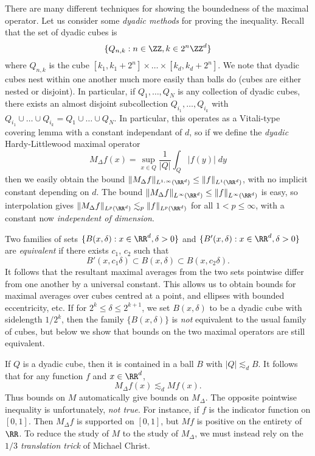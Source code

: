There are many different techniques for showing the boundedness of the maximal operator. Let us consider some \emph{dyadic methods} for proving the inequality. Recall that the set of dyadic cubes is
%
\[ \{ Q_{n,k} : n \in \ZZ, k \in 2^n \ZZ^d \} \]
%
where $Q_{n,k}$ is the cube $[k_1, k_1 + 2^n] \times \dots \times [k_d, k_d + 2^n]$. We note that dyadic cubes nest within one another much more easily than balls do (cubes are either nested or disjoint). In particular, if $Q_1,\dots,Q_N$ is any collection of dyadic cubes, there exists an almost disjoint subcollection $Q_{i_1}, \dots, Q_{i_k}$ with $Q_{i_1} \cup \dots \cup Q_{i_k} = Q_1 \cup \dots \cup Q_N$. In particular, this operates as a Vitali-type covering lemma with a constant independant of $d$, so if we define the \emph{dyadic} Hardy-Littlewood maximal operator
%
\[ M_\Delta f(x) = \sup_{x \in Q} \frac{1}{|Q|} \int_Q |f(y)|\; dy \]
%
then we easily obtain the bound $\| M_\Delta f \|_{L^{1,\infty}(\RR^d)} \leq \| f \|_{L^1(\RR^d)}$, with no implicit constant depending on $d$. The bound $\| M_\Delta f \|_{L^\infty(\RR^d)} \leq \| f \|_{L^\infty(\RR^d)}$ is easy, so interpolation gives $\| M_\Delta f \|_{L^p(\RR^d)} \lesssim_p \| f \|_{L^p(\RR^d)}$ for all $1 < p \leq \infty$, with a constant now \emph{independent of dimension}.

Two families of sets $\{ B(x,\delta) : x \in \RR^d, \delta > 0 \}$ and $\{ B'(x,\delta) : x \in \RR^d, \delta > 0 \}$ are \emph{equivalent} if there exists $c_1$, $c_2$ such that
%
\[ B'(x, c_1 \delta) \subset B(x,\delta) \subset B(x,c_2 \delta). \]
%
It follows that the resultant maximal averages from the two sets pointwise differ from one another by a universal constant. This allows us to obtain bounds for maximal averages over cubes centred at a point, and ellipses with bounded eccentricity, etc. If for $2^k \leq \delta \leq 2^{k+1}$, we set $B(x,\delta)$ to be a dyadic cube with sidelength $1/2^k$, then the family $\{ B(x,\delta) \}$ is \emph{not} equivalent to the usual family of cubes, but below we show that bounds on the two maximal operators are still equivalent.

If $Q$ is a dyadic cube, then it is contained in a ball $B$ with $|Q| \lesssim_d B$. It follows that for any function $f$ and $x \in \RR^d$,
%
\[ M_\Delta f(x) \lesssim_d Mf(x). \]
%
Thus bounds on $M$ automatically give bounds on $M_\Delta$. The opposite pointwise inequality is unfortunately, \emph{not true}. For instance, if $f$ is the indicator function on $[0,1]$. Then $M_\Delta f$ is supported on $[0,1]$, but $Mf$ is positive on the entirety of $\RR$. To reduce the study of $M$ to the study of $M_\Delta$, we must instead rely on the \emph{$1/3$ translation trick} of Michael Christ.

